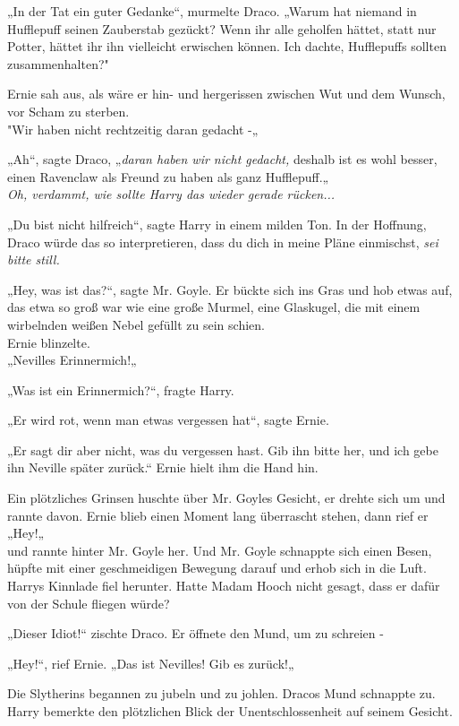 {„In der Tat ein guter Gedanke“, murmelte Draco. „Warum hat niemand in Hufflepuff seinen Zauberstab gezückt? Wenn ihr alle geholfen hättet, statt nur Potter, hättet ihr ihn vielleicht erwischen können. Ich dachte, Hufflepuffs sollten zusammenhalten?"

Ernie sah aus, als wäre er hin- und hergerissen zwischen Wut und dem Wunsch, vor Scham zu sterben.\\ "Wir haben nicht rechtzeitig daran gedacht -„

„Ah“, sagte Draco, „\emph{daran haben wir nicht gedacht,} deshalb ist es wohl besser, einen Ravenclaw als Freund zu haben als ganz Hufflepuff.„\\ \emph{Oh, verdammt, wie sollte Harry das wieder gerade rücken...}

„Du bist nicht hilfreich“, sagte Harry in einem milden Ton. In der Hoffnung, Draco würde das so interpretieren, dass du dich in meine Pläne einmischst, \emph{sei bitte still.}

„Hey, was ist das?“, sagte Mr. Goyle. Er bückte sich ins Gras und hob etwas auf, das etwa so groß war wie eine große Murmel, eine Glaskugel, die mit einem wirbelnden weißen Nebel gefüllt zu sein schien.\\ Ernie blinzelte.\\ „Nevilles Erinnermich!„

„Was ist ein Erinnermich?“, fragte Harry.

„Er wird rot, wenn man etwas vergessen hat“, sagte Ernie.

„Er sagt dir aber nicht, was du vergessen hast. Gib ihn bitte her, und ich gebe ihn Neville später zurück.“ Ernie hielt ihm die Hand hin.

Ein plötzliches Grinsen huschte über Mr. Goyles Gesicht, er drehte sich um und rannte davon. Ernie blieb einen Moment lang überrascht stehen, dann rief er\\ „Hey!„\\ und rannte hinter Mr. Goyle her. Und Mr. Goyle schnappte sich einen Besen, hüpfte mit einer geschmeidigen Bewegung darauf und erhob sich in die Luft.\\ Harrys Kinnlade fiel herunter. Hatte Madam Hooch nicht gesagt, dass er dafür von der Schule fliegen würde?

„Dieser Idiot!“ zischte Draco. Er öffnete den Mund, um zu schreien -

„Hey!“, rief Ernie. „Das ist Nevilles! Gib es zurück!„

Die Slytherins begannen zu jubeln und zu johlen. Dracos Mund schnappte zu. Harry bemerkte den plötzlichen Blick der Unentschlossenheit auf seinem Gesicht.

}
